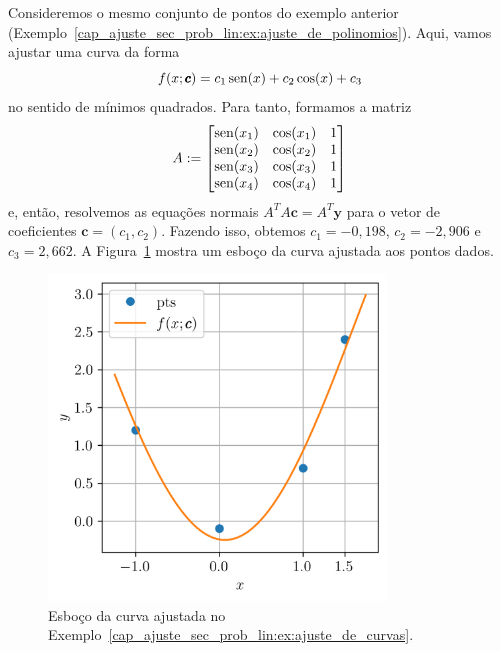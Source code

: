 \begin{ex}\label{cap_ajuste_sec_prob_lin:ex:ajuste_de_curvas}
  Consideremos o mesmo conjunto de pontos do exemplo anterior (Exemplo~\ref{cap_ajuste_sec_prob_lin:ex:ajuste_de_polinomios}). Aqui, vamos ajustar uma curva da forma
  \begin{equation}
    f(x; \pmb{c}) = c_1\operatorname{sen}(x) + c_2\cos(x) + c_3
  \end{equation}
no sentido de mínimos quadrados. Para tanto, formamos a matriz
\begin{equation}
  A :=
  \begin{bmatrix}
    \operatorname{sen}(x_1) & \cos(x_1) & 1 \\
    \operatorname{sen}(x_2) & \cos(x_2) & 1 \\
    \operatorname{sen}(x_3) & \cos(x_3) & 1 \\
    \operatorname{sen}(x_4) & \cos(x_4) & 1
  \end{bmatrix}
\end{equation}
  e, então, resolvemos as equações normais $A^TA\pmb{c} = A^T\pmb{y}$ para o vetor de coeficientes $\pmb{c} = (c_1, c_2)$. Fazendo isso, obtemos $c_1=-0,198$, $c_2=-2,906$ e $c_3=2,662$. A Figura~\ref{cap_ajuste_sec_prob_lin:fig:ex_ajuste_de_curvas} mostra um esboço da curva ajustada aos pontos dados.

  \begin{figure}[h]
    \centering
    \includegraphics[width=0.8\textwidth]{cap_ajuste/dados/fig_mqCurva/fig}
    \caption{Esboço da curva ajustada no Exemplo~\ref{cap_ajuste_sec_prob_lin:ex:ajuste_de_curvas}.}
    \label{cap_ajuste_sec_prob_lin:fig:ex_ajuste_de_curvas}
  \end{figure}


\end{ex}
